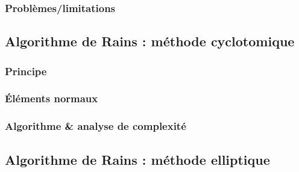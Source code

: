 \documentclass[a4paper]{article} %
\numberwithin{equation}{section}
\begin{document}
\subsubsection{Problèmes/limitations}

\subsection{Algorithme de Rains : méthode cyclotomique}

\subsubsection{Principe}

\subsubsection{Éléments normaux}

\subsubsection{Algorithme \& analyse de complexité}

\subsection{Algorithme de Rains : méthode elliptique}
\end{document}
